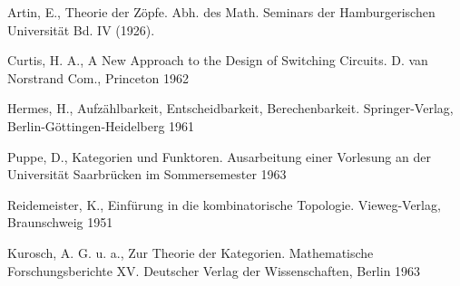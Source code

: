 \documentclass{article}
\begin{document}
\begin{thebibliography}{9}
Artin, E., Theorie der Zöpfe. Abh. des Math. Seminars der Hamburgerischen Universit\"{a}t Bd. IV (1926).

Curtis, H. A., A New Approach to the Design of Switching Circuits. D. van Norstrand Com., Princeton 1962

Hermes, H., Aufz\"{a}hlbarkeit, Entscheidbarkeit, Berechenbarkeit. Springer-Verlag, Berlin-G\"{o}ttingen-Heidelberg 1961

Puppe, D., Kategorien und Funktoren. Ausarbeitung einer Vorlesung an der Universit\"{a}t Saarbr\"{u}cken im Sommersemester 1963

Reidemeister, K., Einf\"{u}rung in die kombinatorische Topologie. Vieweg-Verlag, Braunschweig 1951

Kurosch, A. G. u. a., Zur Theorie der Kategorien. Mathematische Forschungsberichte XV. Deutscher Verlag der Wissenschaften, Berlin 1963
\end{thebibliography}
\end{document}
